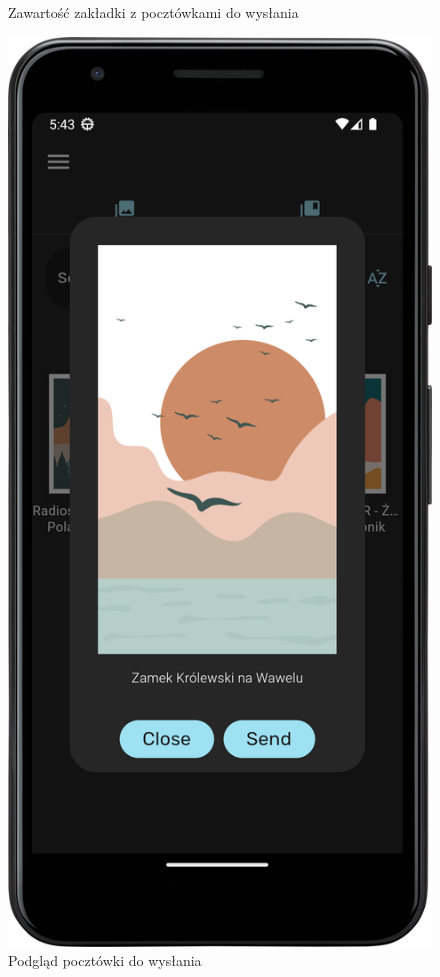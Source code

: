 \documentclass[a4paper,twoside,12pt]{book}
\begin{document}
\begin{figure}[H]
\begin{minipage}[b]{0.49\textwidth}
    \caption{Zawartość zakładki z pocztówkami do wysłania}
  \end{minipage}
  \hfill
  \begin{minipage}[b]{0.49\textwidth}
    \includegraphics[width=\textwidth]{mobile_ss/pocztowki_podglad.png}
    \caption{Podgląd pocztówki do wysłania}
  \end{minipage}
\end{figure}
\end{document}
